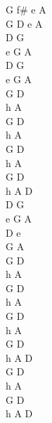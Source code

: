 \begin{chord}
	G f# e A\\
	G D e A\\
	D G\\
	e G A\\
	D G\\
	e G A\\

	G D\\
	h A\\
	G D\\
	h A\\

	G D\\
	h A\\
	G D\\
	h A D\\

	D G\\
	e G A\\
	D e\\
	G A\\

	G D\\
	h A\\
	G D\\
	h A\\

	G D\\
	h A\\
	G D\\
	h A D\\
	
	G D\\
	h A\\
	G D\\
	h A D
\end{chord}
